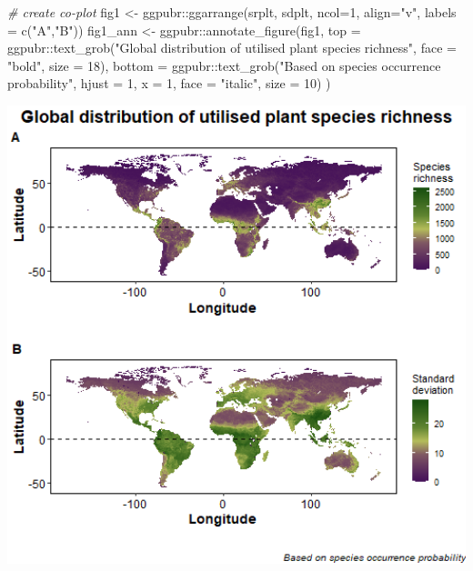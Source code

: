 \documentclass[
]{article}
\newenvironment{Shaded}{\begin{snugshade}}{\end{snugshade}}
\newcommand{\AttributeTok}[1]{\textcolor[rgb]{0.77,0.63,0.00}{#1}}
\newcommand{\CommentTok}[1]{\textcolor[rgb]{0.56,0.35,0.01}{\textit{#1}}}
\newcommand{\DecValTok}[1]{\textcolor[rgb]{0.00,0.00,0.81}{#1}}
\newcommand{\FunctionTok}[1]{\textcolor[rgb]{0.00,0.00,0.00}{#1}}
\newcommand{\NormalTok}[1]{#1}
\newcommand{\OtherTok}[1]{\textcolor[rgb]{0.56,0.35,0.01}{#1}}
\newcommand{\SpecialCharTok}[1]{\textcolor[rgb]{0.00,0.00,0.00}{#1}}
\newcommand{\StringTok}[1]{\textcolor[rgb]{0.31,0.60,0.02}{#1}}
\begin{document}
\begin{Shaded}
\begin{Highlighting}[]
\CommentTok{\# create co{-}plot}
\NormalTok{fig1 }\OtherTok{\textless{}{-}}\NormalTok{ ggpubr}\SpecialCharTok{::}\FunctionTok{ggarrange}\NormalTok{(srplt,}
\NormalTok{                          sdplt,}
                          \AttributeTok{ncol=}\DecValTok{1}\NormalTok{,}
                          \AttributeTok{align=}\StringTok{"v"}\NormalTok{,}
                          \AttributeTok{labels =} \FunctionTok{c}\NormalTok{(}\StringTok{"A"}\NormalTok{,}\StringTok{"B"}\NormalTok{))}
\NormalTok{fig1\_ann }\OtherTok{\textless{}{-}}\NormalTok{ ggpubr}\SpecialCharTok{::}\FunctionTok{annotate\_figure}\NormalTok{(fig1,}
               \AttributeTok{top =}\NormalTok{ ggpubr}\SpecialCharTok{::}\FunctionTok{text\_grob}\NormalTok{(}\StringTok{"Global distribution of utilised plant species richness"}\NormalTok{,}
                                     \AttributeTok{face =} \StringTok{"bold"}\NormalTok{, }\AttributeTok{size =} \DecValTok{18}\NormalTok{),}
               \AttributeTok{bottom =}\NormalTok{ ggpubr}\SpecialCharTok{::}\FunctionTok{text\_grob}\NormalTok{(}\StringTok{"Based on species occurrence probability"}\NormalTok{,}
                                  \AttributeTok{hjust =} \DecValTok{1}\NormalTok{, }\AttributeTok{x =} \DecValTok{1}\NormalTok{, }\AttributeTok{face =} \StringTok{"italic"}\NormalTok{, }\AttributeTok{size =} \DecValTok{10}\NormalTok{)}
\NormalTok{)}
\end{Highlighting}
\end{Shaded}

\begin{center}\includegraphics[width=6.67in]{SR_SD} \end{center}
\end{document}
